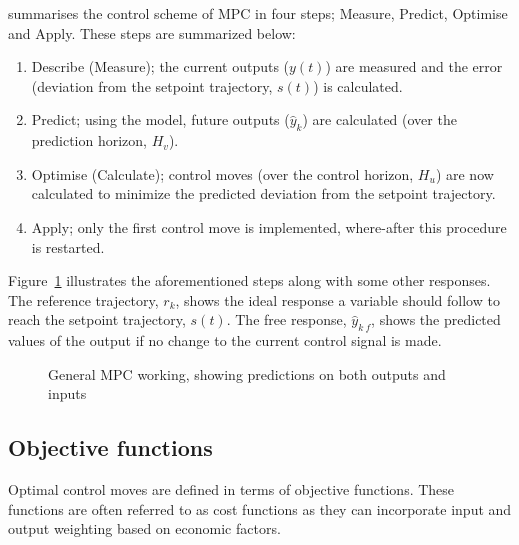 \citet[8]{maciejowskimpc} summarises the control scheme of MPC in four steps; Measure, Predict, Optimise and Apply. 
These steps are summarized below:
\begin{enumerate}
  \item Describe (Measure); the current outputs ($y(t)$) are measured and the error (deviation from the setpoint trajectory, $s(t)$) is calculated.
  \item Predict; using the model, future outputs ($\hat{y}_k$) are calculated (over the prediction horizon, $H_v$).
  \item Optimise (Calculate); control moves (over the control horizon, $H_u$) are now calculated to minimize the predicted deviation from the setpoint trajectory.
  \item Apply; only the first control move is implemented, where-after this procedure is restarted.
\end{enumerate}

Figure~\ref{fig:mpc:general} illustrates the aforementioned steps along with some other responses.
The reference trajectory, $r_k$, shows the ideal response a variable should follow to reach the setpoint trajectory, $s(t)$.
The free response, $\hat{y}_{k~f}$, shows the predicted values of the output if no change to the current control signal is made.

\begin{figure}[htbp]
  \centering
  \scalebox{1}{}  
  \caption[General MPC working]{General MPC working, showing predictions on both outputs and inputs \citep[8]{maciejowskimpc}}
  \label{fig:mpc:general}
\end{figure}

\subsection{Objective functions}
Optimal control moves are defined in terms of objective functions.
These functions are often referred to as cost functions \citep[41]{maciejowskimpc} as they can incorporate input and output weighting based on economic factors.

